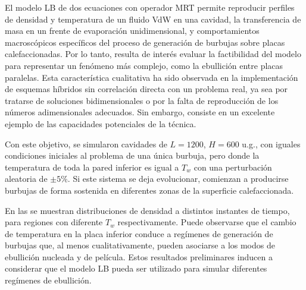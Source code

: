 El modelo LB de dos ecuaciones con operador MRT permite reproducir perfiles de densidad y temperatura de un fluido VdW en una cavidad, la transferencia de masa en un frente de evaporaci\'on unidimensional, y comportamientos macrosc\'opicos espec\'ificos del proceso de generaci\'on de burbujas sobre placas calefaccionadas. Por lo tanto, resulta de inter\'es evaluar la factibilidad del modelo para representar un fen\'omeno m\'as complejo, como la ebullici\'on entre placas paralelas. Esta caracter\'istica cualitativa ha sido observada en la implementaci\'on de esquemas h\'ibridos \cite{li_lattice_2015, fei_mesoscopic_2020} sin correlaci\'on directa con un problema real, ya sea por tratarse de soluciones bidimensionales o por la falta de reproducci\'on de los n\'umeros adimensionales adecuados. Sin embargo, consiste en un excelente ejemplo de las capacidades potenciales de la t\'ecnica.

Con este objetivo, se simularon cavidades de $L=1200$, $H=600$ u.g., con iguales condiciones iniciales al problema de una \'unica burbuja, pero donde la temperatura de toda la pared inferior es igual a $T_w$ con una perturbaci\'on aleatoria de $\pm5\%$. Si este sistema se deja evolucionar, comienzan a producirse burbujas de forma sostenida en diferentes zonas de la superficie calefaccionada.

En las  se muestran distribuciones de densidad a distintos instantes de tiempo, para regiones con diferente $T_w$ respectivamente. Puede observarse que el cambio de temperatura en la placa inferior conduce a reg\'imenes de generaci\'on de burbujas que, al menos cualitativamente, pueden asociarse a los modos de ebullici\'on nucleada y de pel\'icula. Estos resultados preliminares inducen a considerar que el modelo LB pueda ser utilizado para simular diferentes reg\'imenes de ebullici\'on. 

